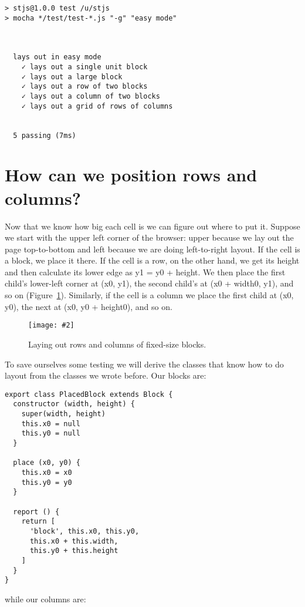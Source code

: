 \documentclass[krantzl]{krantz}
\newcommand{\figpdf}[4]{\begin{figure}%
\centering%
\texttt{[image: \#2]}%
\caption{#3}%
\label{#1}%
\end{figure}}
\newcommand{\figref}[1]{Figure~\ref{#1}}
\begin{document}
\begin{lstlisting}[frame=single,frameround=tttt]
> stjs@1.0.0 test /u/stjs
> mocha */test/test-*.js "-g" "easy mode"



  lays out in easy mode
    ✓ lays out a single unit block
    ✓ lays out a large block
    ✓ lays out a row of two blocks
    ✓ lays out a column of two blocks
    ✓ lays out a grid of rows of columns


  5 passing (7ms)
\end{lstlisting}


\section{How can we position rows and columns?}\label{layout-engine-position}


Now that we know how big each cell is
we can figure out where to put it.
Suppose we start with the upper left corner of the browser:
upper because we lay out the page top-to-bottom
and left because we are doing left-to-right layout.
If the cell is a block, we place it there.
If the cell is a row, on the other hand,
we get its height
and then calculate its lower edge as y1 = y0 + height.
We then place the first child's lower-left corner at (x0, y1),
the second child's at (x0 + width0, y1), and so on
(\figref{layout-engine-layout}).
Similarly,
if the cell is a column
we place the first child at (x0, y0),
the next at (x0, y0 + height0),
and so on.

\figpdf{layout-engine-layout}{./layout-engine/layout.pdf}{Laying out rows and columns of fixed-size blocks.}{0.6}


To save ourselves some testing we will derive the classes that know how to do layout
from the classes we wrote before.
Our blocks are:


\begin{lstlisting}[frame=single,frameround=tttt]
export class PlacedBlock extends Block {
  constructor (width, height) {
    super(width, height)
    this.x0 = null
    this.y0 = null
  }

  place (x0, y0) {
    this.x0 = x0
    this.y0 = y0
  }

  report () {
    return [
      'block', this.x0, this.y0,
      this.x0 + this.width,
      this.y0 + this.height
    ]
  }
}
\end{lstlisting}



\noindent while our columns are:
\end{document}
